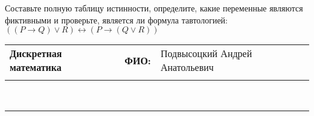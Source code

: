 \documentclass[10pt]{exam}
\newcommand{\class}{Дискретная математика}
\newcommand{\examdate}{}
\begin{document}
\begin{questions}
\begin{enumerate} [a)]
\end{enumerate}\question Составьте полную таблицу истинности, определите, какие переменные являются фиктивными и проверьте, является ли формула тавтологией:
$((P \rightarrow Q) \lor R) \leftrightarrow (P \rightarrow (Q \lor R))$

\end{questions}
\newpage
\begin{flushright}
\begin{tabular}{p{2.8in} r l}
\textbf{\class} & \textbf{ФИО:} &Подвысоцкий Андрей Анатольевич
\\

\textbf{\examdate} &&\\
\end{tabular}\\
\end{flushright}
\rule[1ex]{\textwidth}{.1pt}
\end{document}
